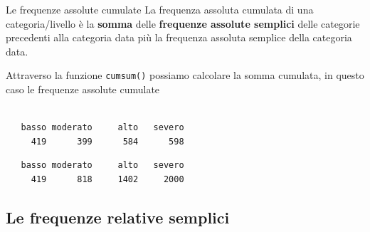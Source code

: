 \documentclass[
  ignorenonframetext,
  compress, aspectratio=149]{beamer}
\newenvironment{Shaded}{\begin{snugshade}}{\end{snugshade}}
\newcommand{\FunctionTok}[1]{\textcolor[rgb]{0.13,0.29,0.53}{\textbf{#1}}}
\newcommand{\NormalTok}[1]{#1}
\newcommand{\SpecialCharTok}[1]{\textcolor[rgb]{0.81,0.36,0.00}{\textbf{#1}}}
\begin{document}
\begin{frame}[fragile]{Le frequenze assolute cumulate}
La frequenza assoluta cumulata di una categoria/livello è la
\textbf{somma} delle \textbf{frequenze assolute semplici} delle
categorie precedenti alla categoria data più la frequenza assoluta
semplice della categoria data.

Attraverso la funzione \texttt{cumsum()} possiamo calcolare la somma
cumulata, in questo caso le frequenze assolute cumulate

\begin{Shaded}
\end{Shaded}

\begin{verbatim}

   basso moderato     alto   severo 
     419      399      584      598 
\end{verbatim}

\begin{Shaded}
\end{Shaded}

\begin{verbatim}
   basso moderato     alto   severo 
     419      818     1402     2000 
\end{verbatim}
\end{frame}

\subsection{Le frequenze relative
semplici}\label{le-frequenze-relative-semplici}
\end{document}
